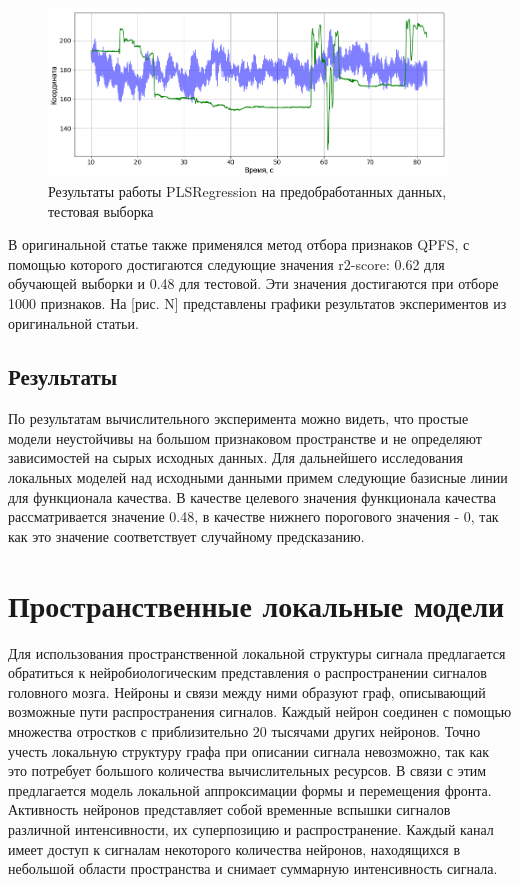 \documentclass{mipt-thesis-bs}
\begin{document}
\begin{figure}[h]
\begin{center}
	\includegraphics[width=300pt,height=\textheight,keepaspectratio]{imgs/motrenko-test.png}
	\caption{Результаты работы PLSRegression на предобработанных данных, тестовая выборка}	
	\label{fig:motr test}
	\end{center}
\end{figure}


 В оригинальной статье также применялся метод отбора признаков QPFS, с помощью которого достигаются следующие значения r2-score: 0.62 для обучающей выборки и 0.48 для тестовой. Эти значения достигаются при отборе 1000 признаков. На [рис. N] представлены графики результатов экспериментов из оригинальной статьи. 

\subsection{Результаты}
По результатам вычислительного эксперимента можно видеть, что простые модели неустойчивы на большом признаковом пространстве и не определяют зависимостей на сырых исходных данных. Для дальнейшего исследования локальных моделей над исходными данными примем следующие базисные линии для функционала качества.
В качестве целевого значения функционала качества рассматривается значение 0.48, в качестве нижнего порогового значения - 0, так как это значение соответствует случайному предсказанию.

\section{Пространственные локальные модели}

Для использования пространственной локальной структуры сигнала предлагается обратиться к нейробиологическим представления о распространении сигналов головного мозга. Нейроны и связи между ними образуют граф, описывающий возможные пути распространения сигналов. Каждый нейрон соединен с помощью множества отростков с приблизительно 20 тысячами других нейронов. Точно учесть локальную структуру графа при описании сигнала невозможно, так как это потребует большого количества вычислительных ресурсов. В связи с этим предлагается модель локальной аппроксимации формы и перемещения фронта. Активность нейронов представляет собой временные вспышки сигналов различной интенсивности, их суперпозицию и распространение. Каждый канал имеет доступ к сигналам некоторого количества нейронов, находящихся в небольшой области пространства и снимает суммарную интенсивность сигнала.  
\end{document}
